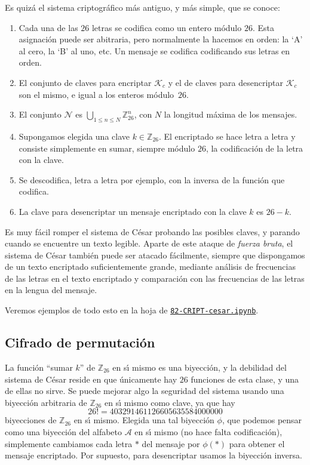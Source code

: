 Es quiz\'a el sistema criptogr\'afico m\'as antiguo, y m\'as simple,  que se
conoce:

\begin{enumerate}
 \item Cada una de las $26$ letras se codifica como un entero m\'odulo $26$.
Esta asignaci\'on puede ser abitraria, pero normalmente la hacemos en orden: la
`A' al cero, la `B' al uno, etc. Un mensaje se codifica codificando sus letras
en orden. 
 \item El conjunto de claves para encriptar $\mathscr{K}_c$ y el de claves para
desencriptar $\mathscr{K}_c$ son el mismo, e igual a los enteros m\'odulo~$26$.
 \item El conjunto $\mathscr{N}$ es $\bigcup_{1\le n\le N}\mathbb{Z}_{26}^n$,
con
$N$ la longitud m\'axima de los mensajes.
 \item Supongamos elegida una clave $k\in \mathbb{Z}_{26}$. El encriptado se
hace letra a letra y consiste simplemente en sumar, siempre m\'odulo $26$, la
codificaci\'on de la letra con la clave. 
 \item Se descodifica, letra a letra por ejemplo, con la inversa de la funci\'on
que codifica.
 \item La clave para desencriptar un mensaje encriptado con la clave $k$ es
$26-k$.
 \end{enumerate}

Es muy f\'acil romper el sistema de C\'esar probando las posibles claves, y
parando cuando se encuentre un texto legible. Aparte de este ataque de {\itshape
fuerza bruta}, el sistema de C\'esar tambi\'en puede ser atacado f\'acilmente,
siempre que dispongamos de un texto encriptado suficientemente grande,  mediante
an\'alisis de frecuencias de las letras en el texto encriptado y comparaci\'on
con las frecuencias de las letras en la lengua del mensaje. 

Veremos ejemplos de todo esto en la hoja de {\sage} 
\href{http://localhost:8888/notebooks/CRIPT/82-CRIPT-cesar.ipynb}{\tt 82-CRIPT-cesar.ipynb}.
 
 
 
 
 
 \subsection{Cifrado de permutaci\'on}

 La funci\'on ``sumar $k$'' de $\mathbb{Z}_{26}$ en s\'{\i} mismo es una
biyecci\'on, y la debilidad del sistema de C\'esar reside en que \'unicamente
hay $26$ funciones de esta clase, y una de ellas no sirve.  Se puede mejorar
algo la seguridad del sistema usando una biyecci\'on arbitraria de
$\mathbb{Z}_{26}$ en s\'{\i} mismo como clave, ya que hay 
\[26!=403291461126605635584000000\]
\noindent  biyecciones de $\mathbb{Z}_{26}$ en s\'{\i} mismo. Elegida una tal
biyecci\'on $\phi$, que podemos
pensar como una biyecci\'on del alfabeto $\mathscr{A}$ en s\'{\i} mismo (no hace
falta codificaci\'on),
simplemente cambiamos cada letra $*$ del mensaje  por $\phi(*)$ para obtener el
mensaje encriptado. Por supuesto, para desencriptar usamos la biyecci\'on
inversa. 



